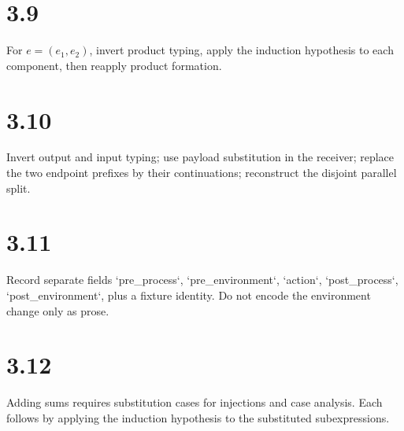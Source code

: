 \section*{3.9}
For $e=(e_1,e_2)$, invert product typing, apply the induction hypothesis to each component, then reapply product formation.

\section*{3.10}
Invert output and input typing; use payload substitution in the receiver; replace the two endpoint prefixes by their continuations; reconstruct the disjoint parallel split.

\section*{3.11}
Record separate fields `pre_process`, `pre_environment`, `action`, `post_process`, `post_environment`, plus a fixture identity. Do not encode the environment change only as prose.

\section*{3.12}
Adding sums requires substitution cases for injections and case analysis. Each follows by applying the induction hypothesis to the substituted subexpressions.
